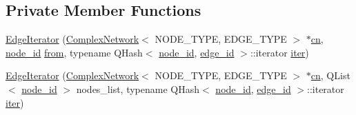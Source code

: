\subsection*{Private Member Functions}
\begin{DoxyCompactItemize}
\item 
\hyperlink{class_complex_network_1_1_edge_iterator_ac5671890837baa91d96ccb0868e29e75}{Edge\+Iterator} (\hyperlink{class_complex_network}{Complex\+Network}$<$ N\+O\+D\+E\+\_\+\+T\+Y\+P\+E, E\+D\+G\+E\+\_\+\+T\+Y\+P\+E $>$ $\ast$\hyperlink{class_complex_network_1_1_edge_iterator_adac38095121d411d64d387dd97eb1c67}{cn}, \hyperlink{_complex_network_8hpp_a8323334ca788fde39682469321590d52}{node\+\_\+id} \hyperlink{class_complex_network_1_1_edge_iterator_a380ccd02563bb5192f6b1e81409d6559}{from}, typename Q\+Hash$<$ \hyperlink{_complex_network_8hpp_a8323334ca788fde39682469321590d52}{node\+\_\+id}, \hyperlink{_complex_network_8hpp_ad7d18d7b90a45b6625704e92d10aa3a0}{edge\+\_\+id} $>$\+::iterator \hyperlink{class_complex_network_1_1_edge_iterator_aec1de93d958a15dbb9ee5c142a18f271}{iter})
\item 
\hyperlink{class_complex_network_1_1_edge_iterator_a7095cb6c1648215bbc8deee5854efeaa}{Edge\+Iterator} (\hyperlink{class_complex_network}{Complex\+Network}$<$ N\+O\+D\+E\+\_\+\+T\+Y\+P\+E, E\+D\+G\+E\+\_\+\+T\+Y\+P\+E $>$ $\ast$\hyperlink{class_complex_network_1_1_edge_iterator_adac38095121d411d64d387dd97eb1c67}{cn}, Q\+List$<$ \hyperlink{_complex_network_8hpp_a8323334ca788fde39682469321590d52}{node\+\_\+id} $>$ nodes\+\_\+list, typename Q\+Hash$<$ \hyperlink{_complex_network_8hpp_a8323334ca788fde39682469321590d52}{node\+\_\+id}, \hyperlink{_complex_network_8hpp_ad7d18d7b90a45b6625704e92d10aa3a0}{edge\+\_\+id} $>$\+::iterator \hyperlink{class_complex_network_1_1_edge_iterator_aec1de93d958a15dbb9ee5c142a18f271}{iter})
\end{DoxyCompactItemize}
